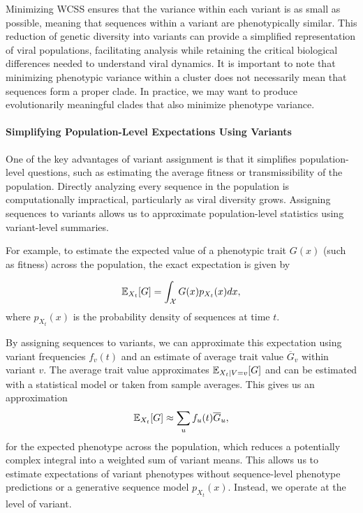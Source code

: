 Minimizing WCSS ensures that the variance within each variant is as small as possible, meaning that sequences within a variant are phenotypically similar.
This reduction of genetic diversity into variants can provide a simplified representation of viral populations, facilitating analysis while retaining the critical biological differences needed to understand viral dynamics.
It is important to note that minimizing phenotypic variance within a cluster does not necessarily mean that sequences form a proper clade.
In practice, we may want to produce evolutionarily meaningful clades that also minimize phenotype variance.

\paragraph{Simplifying Population-Level Expectations Using Variants}

One of the key advantages of variant assignment is that it simplifies population-level questions, such as estimating the average fitness or transmissibility of the population. 
Directly analyzing every sequence in the population is computationally impractical, particularly as viral diversity grows. Assigning sequences to variants allows us to approximate population-level statistics using variant-level summaries.

For example, to estimate the expected value of a phenotypic trait $G(x)$ (such as fitness) across the population, the exact expectation is given by

\begin{equation}
  \mathbb{E}_{X_t}[G] = \int_{\mathcal{X}} G(x) p_{X_{t}}(x) dx,
\end{equation}
where $p_{X_t}(x)$ is the probability density of sequences at time $t$.

By assigning sequences to variants, we can approximate this expectation using variant frequencies $f_{v}(t)$ and an estimate of average trait value $\overline{G}_{v}$ within variant $v$.
The average trait value approximates $\mathbb{E}_{X_t \mid V=v}[G]$ and can be estimated with a statistical model or taken from sample averages.
This gives us an approximation
\begin{equation}
  \mathbb{E}_{X_t}[G] \approx \sum_{u} f_{u}(t) \overline{G}_u,
\end{equation}
for the expected phenotype across the population, which reduces a potentially complex integral into a weighted sum of variant means.
This allows us to estimate expectations of variant phenotypes without sequence-level phenotype predictions or a generative sequence model $p_{X_t}(x)$.
Instead, we operate at the level of variant.


